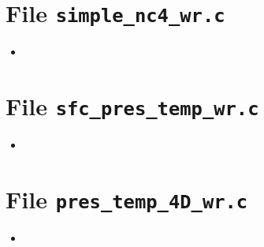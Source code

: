 \documentclass[compress,11pt,xcolor=svgnames,aspectratio=169]{beamer}
\begin{document}
\section{File \texttt{simple\_nc4\_wr.c}}

\begin{frame}[fragile]{}

\begin{itemize}

  \item

\end{itemize}

\end{frame}

\section{File \texttt{sfc\_pres\_temp\_wr.c}}

\begin{frame}[fragile]{}

\begin{itemize}

  \item

\end{itemize}

\end{frame}

\section{File \texttt{pres\_temp\_4D\_wr.c}}

\begin{frame}[fragile]{}

\begin{itemize}

  \item

\end{itemize}

\end{frame}

\acknowledgement
\end{document}
